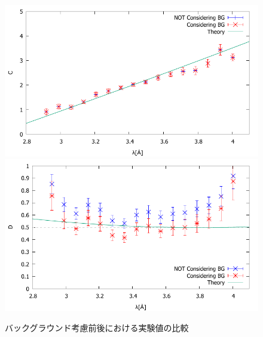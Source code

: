 \begin{figure}[H]
\begin{center}
\ContinuedFloat
\includegraphics[width=12cm]{discussion/ABCD/C_ab_fit.pdf}
\vspace{1cm}
\includegraphics[width=12cm]{discussion/ABCD/D_ab.pdf}
\end{center}
\caption{バックグラウンド考慮前後における実験値の比較}\label{Discussion_fig_ABCDb}
\end{figure}


